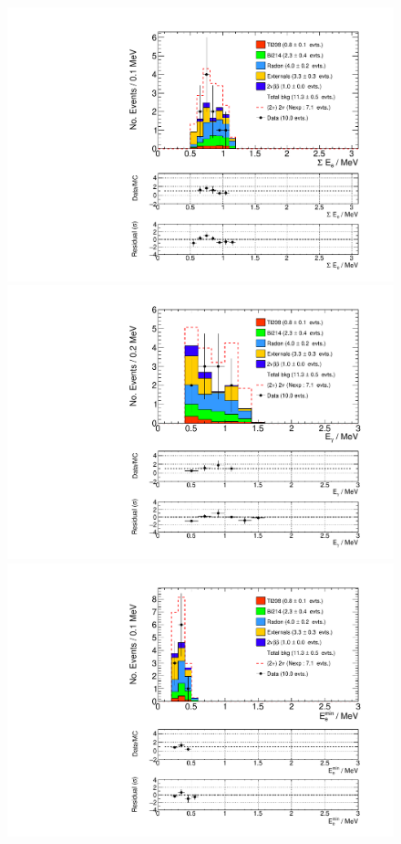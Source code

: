 \documentclass[main.tex]{subfiles}
\begin{document}
\begin{figure} [h!]
\begin{center}
\includegraphics[scale=0.37]{pictures/FinalResults/bb2nu2/250/SEe_bb2nu2.pdf}
\includegraphics[scale=0.37]{pictures/FinalResults/bb2nu2/250/Eg_bb2nu2.pdf}
\includegraphics[scale=0.37]{pictures/FinalResults/bb2nu2/250/Eemin_bb2nu2.pdf}

\end{center}
\end{figure}
\end{document}
